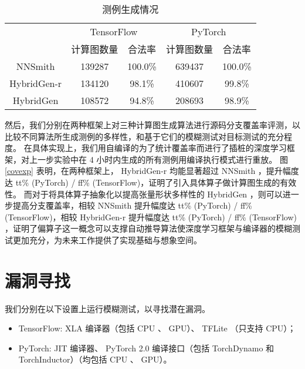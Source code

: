 \begin{table}[]
\centering
\caption{测例生成情况}
\label{tab:num_tests}
\begin{tabular}{ccccc}
  \toprule
  \multirow{2}{*}{} & \multicolumn{2}{c}{TensorFlow} & \multicolumn{2}{c}{PyTorch} \\ \cmidrule(lr){2-3} \cmidrule(lr){4-5} 
                    & 计算图数量        & 合法率             & 计算图数量      & 合法率            \\ \midrule
  NNSmith           & 139287       & 100.0\%      & 639437     & 100.0\%     \\
  HybridGen-r       & 134120       & 98.1\%      & 410607     & 99.8\%     \\
  HybridGen         & 108572       & 94.8\%      & 208693     & 98.9\%     \\ \bottomrule
\end{tabular}
\end{table}

然后，我们分别在两种框架上对三种计算图生成算法进行源码分支覆盖率评测，以比较不同算法所生成测例的多样性，和基于它们的模糊测试对目标测试的充分程度。
在具体实现上，我们用自编译的为了统计覆盖率而进行了插桩的深度学习框架，对上一步实验中在 4 小时内生成的所有测例用编译执行模式进行重放。
图 \ref{covexp} 表明，在两种框架上， HybridGen-r 均能显著超过 NNSmith ，提升幅度达 tt\% (PyTorch) / ff\% (TensorFlow)，证明了引入具体算子做计算图生成的有效性。
而对于将具体算子抽象化以提高张量形状多样性的 HybridGen ，则可以进一步提高分支覆盖率，相较 NNSmith 提升幅度达 tt\% (PyTorch) / ff\% (TensorFlow)，相较 HybridGen-r 提升幅度达 tt\% (PyTorch) / ff\% (TensorFlow) ，证明了偏算子这一概念可以支撑自动推导算法使深度学习框架与编译器的模糊测试更加充分，为未来工作提供了实现基础与想象空间。


\section{漏洞寻找}

我们分别在以下设置上运行模糊测试，以寻找潜在漏洞。

\begin{itemize}
    \item TensorFlow: XLA 编译器（包括 CPU 、 GPU）、 TFLite （只支持 CPU）；
    \item PyTorch: JIT 编译器、 PyTorch 2.0 编译接口（包括 TorchDynamo 和 TorchInductor）（均包括 CPU 、 GPU）。
\end{itemize}

